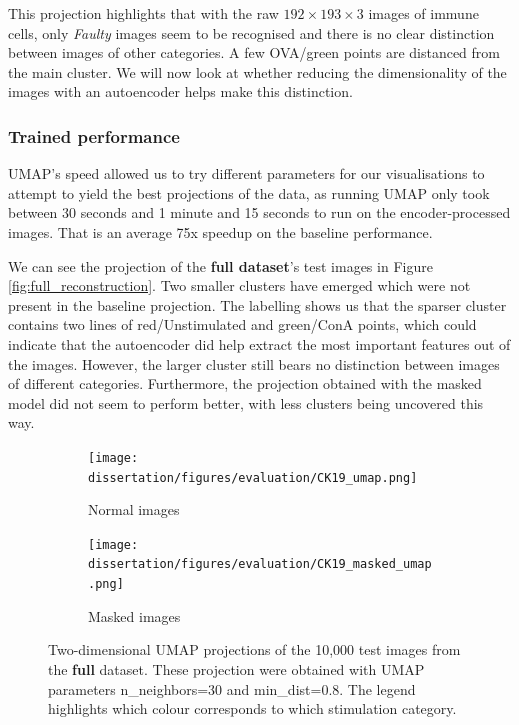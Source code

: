 This projection highlights that with the raw $192\times193\times3$ images of immune cells, only \textit{Faulty} images seem to be recognised and there is no clear distinction between images of other categories. A few OVA/green points are distanced from the main cluster. We will now look at whether reducing the dimensionality of the images with an autoencoder helps make this distinction.  

\bigskip
\subsubsection{Trained performance}
\hfill
\hfill 

UMAP's speed allowed us to try different parameters for our visualisations to attempt to yield the best projections of the data, as running UMAP only took between 30 seconds and 1 minute and 15 seconds to run on the encoder-processed images. That is an average 75x speedup on the baseline performance.

We can see the projection of the \textbf{full dataset}'s test images in Figure \ref{fig:full_reconstruction}. Two smaller clusters have emerged which were not present in the baseline projection. The labelling shows us that the sparser cluster contains two lines of red/Unstimulated and green/ConA points, which could indicate that the autoencoder did help extract the most important features out of the images. However, the larger cluster still bears no distinction between images of different categories. Furthermore, the projection obtained with the masked model did not seem to perform better, with less clusters being uncovered this way.

\begin{figure}[h!]
    \centering
    \begin{subfigure}[h!]{0.39\textwidth}
        \texttt{[image: dissertation/figures/evaluation/CK19\_umap.png]}
        \caption{Normal images}
        \label{subfig:full_projection_normal}
    \end{subfigure}
    \begin{subfigure}[h!]{0.41\textwidth}
        \texttt{[image: dissertation/figures/evaluation/CK19\_masked\_umap.png]}
        \caption{Masked images}
    \end{subfigure}
    \caption{Two-dimensional UMAP projections of the 10,000 test images from the \textbf{full} dataset. These projection were obtained with UMAP parameters n\_neighbors=30 and min\_dist=0.8. The legend highlights which colour corresponds to which stimulation category.}
    \label{fig:full_projection}
\end{figure}

